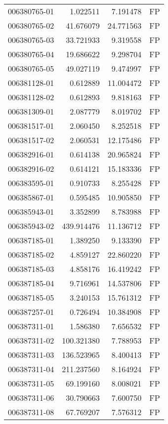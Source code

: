\begin{tabular}{lrrl}
006380765-01 &    1.022511 &     7.191478 &   FP \\
006380765-02 &   41.676079 &    24.771563 &   FP \\
006380765-03 &   33.721933 &     9.319558 &   FP \\
006380765-04 &   19.686622 &     9.298704 &   FP \\
006380765-05 &   49.027119 &     9.474997 &   FP \\
006381128-01 &    0.612889 &    11.004472 &   FP \\
006381128-02 &    0.612893 &     9.818163 &   FP \\
006381309-01 &    2.087779 &     8.019702 &   FP \\
006381517-01 &    2.060450 &     8.252518 &   FP \\
006381517-02 &    2.060531 &    12.175486 &   FP \\
006382916-01 &    0.614138 &    20.965824 &   FP \\
006382916-02 &    0.614121 &    15.183336 &   FP \\
006383595-01 &    0.910733 &     8.255428 &   FP \\
006385867-01 &    0.595485 &    10.905850 &   FP \\
006385943-01 &    3.352899 &     8.783988 &   FP \\
006385943-02 &  439.914476 &    11.136712 &   FP \\
006387185-01 &    1.389250 &     9.133390 &   FP \\
006387185-02 &    4.859127 &    22.860220 &   FP \\
006387185-03 &    4.858176 &    16.419242 &   FP \\
006387185-04 &    9.716961 &    14.537806 &   FP \\
006387185-05 &    3.240153 &    15.761312 &   FP \\
006387257-01 &    0.726494 &    10.384908 &   FP \\
006387311-01 &    1.586380 &     7.656532 &   FP \\
006387311-02 &  100.321380 &     7.788953 &   FP \\
006387311-03 &  136.523965 &     8.400413 &   FP \\
006387311-04 &  211.237560 &     8.164924 &   FP \\
006387311-05 &   69.199160 &     8.008021 &   FP \\
006387311-06 &   30.790663 &     7.600750 &   FP \\
006387311-08 &   67.769207 &     7.576312 &   FP \\

\end{tabular}

